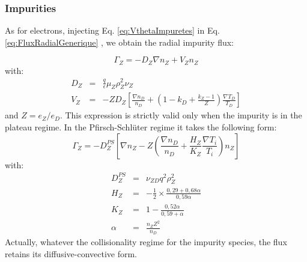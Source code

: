 						\subsubsection{Impurities}
						\label{sec:FluxRadialImpuretes}


As for electrons, injecting Eq. \ref{eq:VthetaImpuretes} in Eq. \ref{eq:FluxRadialGenerique} , we obtain the radial impurity flux:

\begin{equation}
		\Gamma_Z = - D_Z\nabla n_Z + V_Z n_Z
\end{equation}
with:
\begin{eqnarray}
		D_Z &	=	& \frac{q}{\epsilon}\mu_Z\rho_Z^2\nu_Z			\\
		V_Z	&	=	&	-ZD_Z\left[\frac{\nabla n_D}{n_D} + \left( 1-k_D+\frac{k_Z-1}{Z} \right)\frac{\nabla T_D}{T_D}  \right]
\end{eqnarray}
and $Z = e_Z/e_D$. This expression is strictly valid only when the impurity is in the plateau regime. In the Pfirsch-Schlüter regime it takes the following form:
\begin{equation}
		\Gamma_Z = -D_Z^{PS} \left[\nabla n_Z - Z\left( \frac{\nabla n_D}{n_D} + \frac{H_Z}{K_Z}\frac{\nabla T_i}{T_i} \right)n_Z \right]
\end{equation}
with:
\begin{eqnarray}
		D_Z^{PS}	&	=	&	\nu_{ZD}q^2\rho_Z^2		\nonumber															\\
		H_Z				&	=	&	-\frac{1}{2}\times \frac{0,29 + 0,68\alpha}{0,59\alpha}	\nonumber	\\
		K_Z				&	=	&	1 - \frac{0,52\alpha}{0,59+\alpha}	\nonumber								\\
		\alpha 		&	=	&	\frac{n_Z Z^2}{n_D}
\end{eqnarray}
Actually, whatever the collisionality regime for the impurity species, the flux retains its diffusive-convective form.

